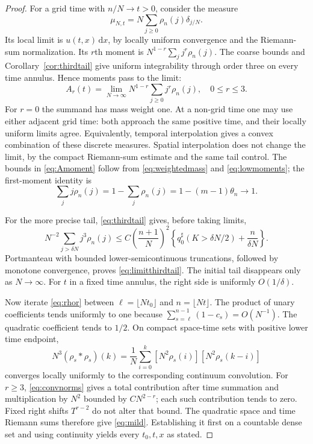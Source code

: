 \documentclass[11pt,letterpaper,reqno]{amsart}
\theoremstyle{plain}
\newcommand{\dd}{\,\mathrm d}
\newcommand{\floor}[1]{\lfloor#1\rfloor}
\begin{document}
\begin{proof}
For a grid time with $n/N\to t>0$, consider the measure
\[
 \mu_{N,t}=N\sum_{j\ge0}\rho_n(j)\delta_{j/N}.
\]
Its local limit is $u(t,x)\dd x$, by locally uniform convergence and the Riemann-sum normalization. Its $r$th moment is $N^{1-r}\sum_jj^r\rho_n(j)$. The coarse bounds and Corollary~\ref{cor:thirdtail} give uniform integrability through order three on every time annulus. Hence moments pass to the limit:
\begin{equation}\label{eq:momentpass}
 A_r(t)=\lim_{N\to\infty}N^{1-r}\sum_{j\ge0}j^r\rho_n(j),\quad0\le r\le3.
\end{equation}
For $r=0$ the summand has mass weight one. At a non-grid time one may use either adjacent grid time: both approach the same positive time, and their locally uniform limits agree. Equivalently, temporal interpolation gives a convex combination of these discrete measures. Spatial interpolation does not change the limit, by the compact Riemann-sum estimate and the same tail control. The bounds in \eqref{eq:Amoment} follow from \eqref{eq:weightedmass} and \eqref{eq:lowmoments}; the first-moment identity is
\[
 \sum_jj\rho_n(j)=1-\sum_j\rho_n(j)=1-(m-1)\theta_n\longrightarrow1.
\]

For the more precise tail, \eqref{eq:thirdtail} gives, before taking limits,
\[
 N^{-2}\sum_{j>\delta N}j^3\rho_n(j)
 \le C\left(\frac{n+1}{N}\right)^2
 \left\{q_0^\sharp(K>\delta N/2)+\frac n{\delta N}\right\}.
\]
Portmanteau with bounded lower-semicontinuous truncations, followed by monotone convergence, proves \eqref{eq:limitthirdtail}. The initial tail disappears only as $N\to\infty$. For $t$ in a fixed time annulus, the right side is uniformly $O(1/\delta)$.

Now iterate \eqref{eq:rhor} between $\ell=\floor{Nt_0}$ and $n=\floor{Nt}$. The product of unary coefficients tends uniformly to one because $\sum_{s=\ell}^{n-1}(1-c_s)=O(N^{-1})$. The quadratic coefficient tends to $1/2$. On compact space-time sets with positive lower time endpoint,
\[
 N^3(\rho_s*\rho_s)(k)
 =\frac1N\sum_{i=0}^k[N^2\rho_s(i)][N^2\rho_s(k-i)]
\]
converges locally uniformly to the corresponding continuum convolution. For $r\ge3$, \eqref{eq:convnorms} gives a total contribution after time summation and multiplication by $N^2$ bounded by $CN^{2-r}$; each such contribution tends to zero. Fixed right shifts $T^{r-2}$ do not alter that bound. The quadratic space and time Riemann sums therefore give \eqref{eq:mild}. Establishing it first on a countable dense set and using continuity yields every $t_0,t,x$ as stated.
\end{proof}
\end{document}
